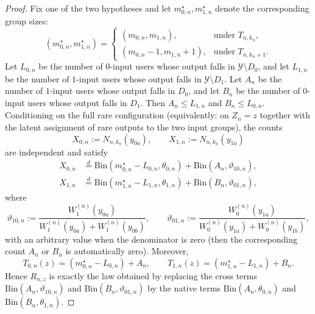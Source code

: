 \documentclass{article}
\begin{document}
\begin{proof}
Fix one of the two hypotheses and let $m_{0,n}^\star,m_{1,n}^\star$ denote the corresponding group sizes:
\[
(m_{0,n}^\star,m_{1,n}^\star)=
\begin{cases}
(m_{0,n},m_{1,n}), & \text{under }T_{n,k_n},\\
(m_{0,n}-1,m_{1,n}+1), & \text{under }T_{n,k_n+1}.
\end{cases}
\]
Let $L_{0,n}$ be the number of $0$-input users whose output falls in $\mathcal Y\setminus D_0$, and let $L_{1,n}$ be the number of $1$-input users whose output falls in $\mathcal Y\setminus D_1$. Let $A_n$ be the number of $1$-input users whose output falls in $D_0$, and let $B_n$ be the number of $0$-input users whose output falls in $D_1$. Then $A_n\le L_{1,n}$ and $B_n\le L_{0,n}$. Conditioning on the full rare configuration (equivalently: on $Z_n=z$ together with the latent assignment of rare outputs to the two input groups), the counts
\[
X_{0,n}:=N_{n,k_n}(y_{0a}),
\qquad
X_{1,n}:=N_{n,k_n}(y_{1a})
\]
are independent and satisfy
\begin{align*}
X_{0,n}
&\overset d= \mathrm{Bin}(m_{0,n}^\star-L_{0,n},\theta_{0,n})+\mathrm{Bin}(A_n,\vartheta_{10,n}),\\
X_{1,n}
&\overset d= \mathrm{Bin}(m_{1,n}^\star-L_{1,n},\theta_{1,n})+\mathrm{Bin}(B_n,\vartheta_{01,n}),
\end{align*}
where
\[
\vartheta_{10,n}:=\frac{W_1^{(n)}(y_{0a})}{W_1^{(n)}(y_{0a})+W_1^{(n)}(y_{0b})},
\qquad
\vartheta_{01,n}:=\frac{W_0^{(n)}(y_{1a})}{W_0^{(n)}(y_{1a})+W_0^{(n)}(y_{1b})},
\]
with an arbitrary value when the denominator is zero (then the corresponding count $A_n$ or $B_n$ is automatically zero). Moreover,
\[
T_{0,n}(z)=(m_{0,n}^\star-L_{0,n})+A_n,
\qquad
T_{1,n}(z)=(m_{1,n}^\star-L_{1,n})+B_n.
\]
Hence $R_{n,z}$ is exactly the law obtained by replacing the cross terms $\mathrm{Bin}(A_n,\vartheta_{10,n})$ and $\mathrm{Bin}(B_n,\vartheta_{01,n})$ by the native terms $\mathrm{Bin}(A_n,\theta_{0,n})$ and $\mathrm{Bin}(B_n,\theta_{1,n})$.


\end{proof}
\end{document}
